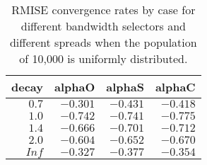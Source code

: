\begin{table}[htbp]
\begin{center}
\begin{tabular}{rrrr}
\toprule
\multicolumn{1}{c}{decay}&\multicolumn{1}{c}{alphaO}&\multicolumn{1}{c}{alphaS}&\multicolumn{1}{c}{alphaC}\tabularnewline
\midrule
$0.7$&$-0.301$&$-0.431$&$-0.418$\tabularnewline
$1.0$&$-0.742$&$-0.741$&$-0.775$\tabularnewline
$1.4$&$-0.666$&$-0.701$&$-0.712$\tabularnewline
$2.0$&$-0.604$&$-0.652$&$-0.670$\tabularnewline
$Inf$&$-0.327$&$-0.377$&$-0.354$\tabularnewline
\bottomrule
\end{tabular}
\caption[RMISE Convergence rate by case for different spreads]{RMISE convergence rates by case for different bandwidth selectors and different spreads when the population of 10,000 is uniformly distributed.\label{tab:results:rmise_convergence_by_cases_and_spread}}\end{center}
\end{table}
